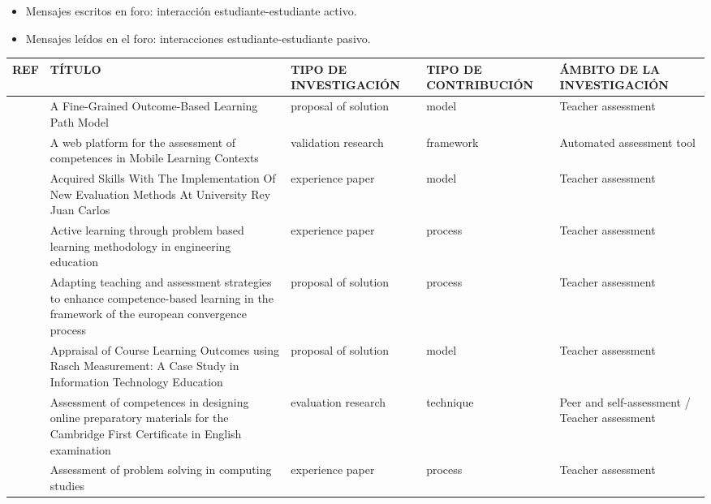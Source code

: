 \begin{itemize}
\item Mensajes escritos en foro: interacción estudiante-estudiante activo.
\item Mensajes leídos en el foro:  interacciones estudiante-estudiante pasivo.
\end{itemize}

\pagestyle{empty}
\begin{landscape}
\begin{center}
\begin{longtable}{| c | m{9cm} | m{4cm} | m{2.5cm} | m{3.5cm} |}
    \hline
    REF & TÍTULO & TIPO DE INVESTIGACIÓN & TIPO DE CONTRIBUCIÓN & ÁMBITO DE LA INVESTIGACIÓN \\
    \hline
    \hline 
    \cite{yang2014fine} & A Fine-Grained Outcome-Based Learning Path Model & proposal of solution & model & Teacher assessment \\
    \hline
    \cite{rayon2014web} & A web platform for the assessment of competences in Mobile Learning Contexts & validation research & framework & Automated assessment tool \\
    \hline
    \cite{martin2013acquired} & Acquired Skills With The Implementation Of New Evaluation Methods At University Rey Juan Carlos & experience paper & model & Teacher assessment \\
    \hline
    \cite{lacuesta2009active} & Active learning through problem based learning methodology in engineering education & experience paper & process & Teacher assessment \\
    \hline
    \cite{benlloch2007adapting} & Adapting teaching and assessment strategies to enhance competence-based learning in the framework of the european convergence process & proposal of solution & process & Teacher assessment \\
    \hline
    \cite{aziz2007appraisal} & Appraisal of Course Learning Outcomes using Rasch Measurement: A Case Study in Information Technology Education & proposal of solution & model & Teacher assessment \\
    \hline
    \cite{sevilla2012assessment} & Assessment of competences in designing online preparatory materials for the Cambridge First Certificate in English examination & evaluation research & technique & Peer and self-assessment / Teacher assessment \\
    \hline
    \cite{vizcarro2013assessment} & Assessment of problem solving in computing studies & experience paper & process & Teacher assessment \\

\end{longtable}
\end{center}
\end{landscape}
